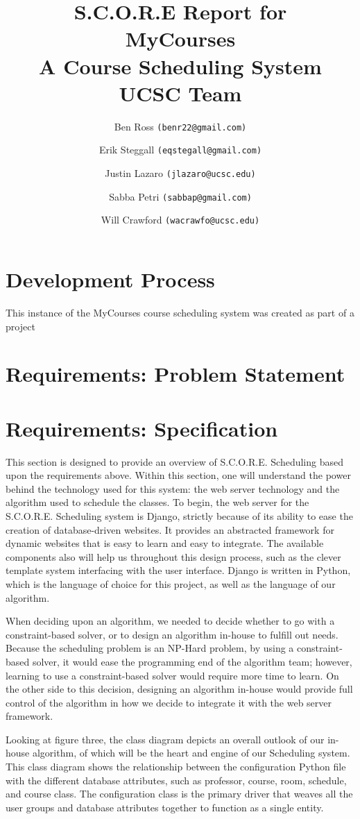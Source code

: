 \documentclass[12pt,article]{memoir}
\title{S.C.O.R.E Report for\\ MyCourses \\ A Course Scheduling System \\ UCSC Team}
\author{Ben Ross \texttt{(benr22@gmail.com)} \\
	\and Erik Steggall \texttt{(eqstegall@gmail.com)}\\
	\and Justin Lazaro \texttt{(jlazaro@ucsc.edu)}\\
	\and Sabba Petri \texttt{(sabbap@gmail.com)}\\
	\and Will Crawford \texttt{(wacrawfo@ucsc.edu)}}
\date{}
\begin{document}
\maketitle

\chapter{Development Process} %
This instance of the MyCourses course scheduling system was created as part of a project 
\chapter{Requirements: Problem Statement} %
\chapter{Requirements: Specification} %
This section is designed to provide an overview of S.C.O.R.E. Scheduling based upon the requirements above. Within this section, one will understand the power behind the technology used for this system: the web server technology and the algorithm used to schedule the classes. To begin, the web server for the S.C.O.R.E. Scheduling system is Django, strictly because of its ability to ease the creation of database-driven websites. It provides an abstracted framework for dynamic websites that is easy to learn and easy to integrate. The available components also will help us throughout this design process, such as the clever template system interfacing with the user interface. Django is written in Python, which is the language of choice for this project, as well as the language of our algorithm.

When deciding upon an algorithm, we needed to decide whether to go with a constraint-based solver, or to design an algorithm in-house to fulfill out needs. Because the scheduling problem is an NP-Hard problem, by using a constraint-based solver, it would ease the programming end of the algorithm team; however, learning to use a constraint-based solver would require more time to learn. On the other side to this decision, designing an algorithm in-house would provide full control of the algorithm in how we decide to integrate it with the web server framework.

Looking at figure three, the class diagram depicts an overall outlook of our in-house algorithm, of which will be the heart and engine of our Scheduling system. This class diagram shows the relationship between the configuration Python file with the different database attributes, such as professor, course, room, schedule, and course class. The configuration class is the primary driver that weaves all the user groups and database attributes together to function as a single entity.  
\end{document}
